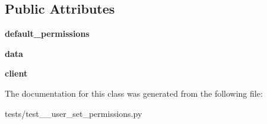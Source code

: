 \subsection*{Public Attributes}
\begin{DoxyCompactItemize}
\item 
\mbox{\label{classtests_1_1test__11__user__set__permissions_1_1_test_user_routes_a3fe6f2afd6e60c31d315931170d88739}} 
{\bfseries default\+\_\+permissions}
\item 
\mbox{\label{classtests_1_1test__11__user__set__permissions_1_1_test_user_routes_a13c16ed02fccf697e22b5b5a06bd7e62}} 
{\bfseries data}
\item 
\mbox{\label{classtests_1_1test__11__user__set__permissions_1_1_test_user_routes_a92a039eed984bac700bacc2e60af4639}} 
{\bfseries client}
\end{DoxyCompactItemize}


The documentation for this class was generated from the following file\+:\begin{DoxyCompactItemize}
\item 
tests/test\+\_\+\_\+user\+\_\+set\+\_\+permissions.\+py\end{DoxyCompactItemize}
